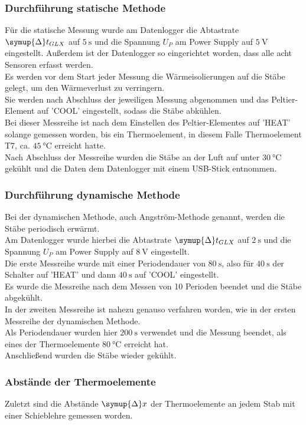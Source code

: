 \subsubsection{Durchführung statische Methode}
Für die statische Messung wurde am Datenlogger die Abtastrate $\symup{\Delta}t_{GLX}$ auf $\SI{5}{\second}$ und die Spannung
$U_P$ am Power Supply auf $\SI{5}{\volt}$ eingestellt. Außerdem ist der Datenlogger so eingerichtet worden, dass alle acht Sensoren
erfasst werden. \\
Es werden vor dem Start jeder Messung die Wärmeisolierungen auf die Stäbe gelegt, um den Wärmeverlust zu verringern.\\
Sie werden nach Abschluss der jeweiligen Messung abgenommen und das Peltier-Element auf 'COOL' eingestellt, sodass die Stäbe abkühlen.\\
Bei dieser Messreihe ist nach dem Einstellen des Peltier-Elementes auf 'HEAT' solange gemessen worden, bis ein Thermoelement, in diesem Falle
Thermoelement T7, ca. $\SI{45}{\celsius}$ erreicht hatte. \\
Nach Abschluss der Messreihe wurden die Stäbe an der Luft
auf unter $\SI{30}{\celsius}$ gekühlt und die Daten dem Datenlogger mit einem USB-Stick entnommen.
\subsubsection{Durchführung dynamische Methode}
Bei der dynamischen Methode, auch Angström-Methode genannt, werden die Stäbe periodisch erwärmt.\\
Am Datenlogger wurde hierbei die Abtastrate $\symup{\Delta}t_{GLX}$ auf $\SI{2}{\second}$
und die Spannung $U_P$ am Power Supply auf $\SI{8}{\volt}$ eingestellt.\\ 
Die erste Messreihe
wurde mit einer Periodendauer von $\SI{80}{\second}$, also für $\SI{40}{\second}$ der Schalter auf 'HEAT' und dann
$\SI{40}{\second}$ auf 'COOL' eingestellt. \\
Es wurde die Messreihe nach dem Messen von 10 Perioden beendet und die Stäbe abgekühlt.\\
In der zweiten Messreihe ist nahezu genauso verfahren worden, wie in der ersten Messreihe der dynamischen Methode. \\
Als Periodendauer wurden hier
$\SI{200}{\second}$ verwendet und die Messung beendet, als eines der Thermoelemente $\SI{80}{\celsius}$ erreicht hat.\\
Anschließend wurden die Stäbe wieder gekühlt.
\subsubsection{Abstände der Thermoelemente}
Zuletzt sind die Abstände $\symup{\Delta}x$ der Thermoelemente an jedem Stab mit einer Schieblehre gemessen worden.\\